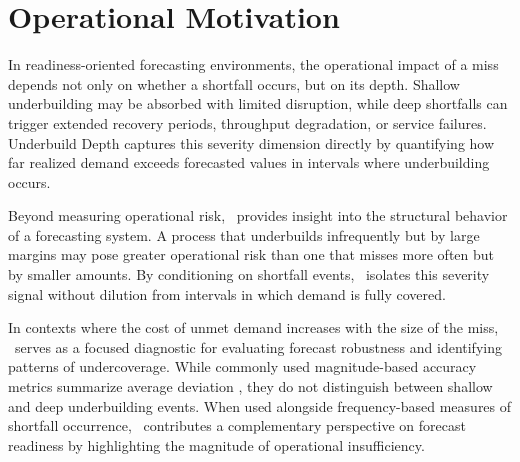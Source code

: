 \section{Operational Motivation}

In readiness-oriented forecasting environments, the operational impact of a miss
depends not only on whether a shortfall occurs, but on its depth. Shallow
underbuilding may be absorbed with limited disruption, while deep shortfalls can
trigger extended recovery periods, throughput degradation, or service failures.
Underbuild Depth captures this severity dimension directly by quantifying how far
realized demand exceeds forecasted values in intervals where underbuilding occurs.

Beyond measuring operational risk, \UD\ provides insight into the structural
behavior of a forecasting system. A process that underbuilds infrequently but by
large margins may pose greater operational risk than one that misses more often
but by smaller amounts. By conditioning on shortfall events, \UD\ isolates this
severity signal without dilution from intervals in which demand is fully covered.

In contexts where the cost of unmet demand increases with the size of the miss,
\UD\ serves as a focused diagnostic for evaluating forecast robustness and
identifying patterns of undercoverage. While commonly used magnitude-based
accuracy metrics summarize average deviation \citep{hyndman2006another}, they do
not distinguish between shallow and deep underbuilding events. When used
alongside frequency-based measures of shortfall occurrence, \UD\ contributes a
complementary perspective on forecast readiness by highlighting the magnitude of
operational insufficiency.
